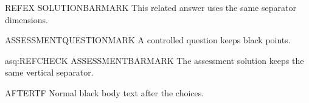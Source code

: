 \begin{booksolution}{REFEX}
SOLUTIONBARMARK This related answer uses the same separator dimensions.
\end{booksolution}
\begin{AssessmentQuestion}[5]
ASSESSMENTQUESTIONMARK A controlled question keeps black points.\label{asq:REFCHECK}
\end{AssessmentQuestion}
\begin{AssessmentSolution}{asq:REFCHECK}
ASSESSMENTBARMARK The assessment solution keeps the same vertical separator.
\end{AssessmentSolution}
\clearpage
{}
\begin{multicols}{2}
\begin{enumerate}
%
\sbox{\RefinementChoicesBox}{\TrueFalseChoices}%
%
%
%
\ifdim\wd\RefinementMathBox>\linewidth
  \PackageError{refinement-fixture}{Math object itself exceeds the column}{}%
\fi
\ifdim\dimexpr\wd\RefinementMathBox+\wd\RefinementChoicesBox+.6em\relax<\linewidth
  \PackageError{refinement-fixture}{Math plus choices does not exercise wrapping}{}%
\fi
{}
\end{enumerate}
\end{multicols}
AFTERTF Normal black body text after the choices.

